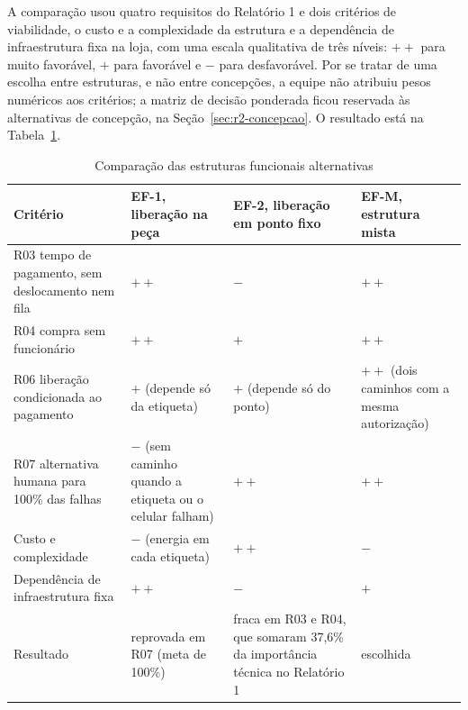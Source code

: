 A comparação usou quatro requisitos do Relatório 1 e dois critérios de viabilidade, o custo e a complexidade da estrutura e a dependência de infraestrutura fixa na loja, com uma escala qualitativa de três níveis: $++$ para muito favorável, $+$ para favorável e $-$ para desfavorável. Por se tratar de uma escolha entre estruturas, e não entre concepções, a equipe não atribuiu pesos numéricos aos critérios; a matriz de decisão ponderada ficou reservada às alternativas de concepção, na Seção~\ref{sec:r2-concepcao}. O resultado está na Tabela~\ref{tab:r2-estruturas}.

\begin{table}[htbp]
    \centering
    \caption{Comparação das estruturas funcionais alternativas}
    \label{tab:r2-estruturas}
    \footnotesize
    \renewcommand{\arraystretch}{1.25}
    \begin{tabularx}{\textwidth}{@{}
        >{\RaggedRight\arraybackslash}p{3.8cm}
        >{\RaggedRight\arraybackslash}X
        >{\RaggedRight\arraybackslash}X
        >{\RaggedRight\arraybackslash}X@{}}
        \toprule
        \textbf{Critério} & \textbf{EF-1, liberação na peça} & \textbf{EF-2, liberação em ponto fixo} & \cellcolor{r2laranjaclaro}\textbf{EF-M, estrutura mista} \\
        \midrule
        R03 tempo de pagamento, sem deslocamento nem fila & $++$ & $-$ & \cellcolor{r2laranjaclaro}$++$ \\
        R04 compra sem funcionário & $++$ & $+$ & \cellcolor{r2laranjaclaro}$++$ \\
        R06 liberação condicionada ao pagamento & $+$ (depende só da etiqueta) & $+$ (depende só do ponto) & \cellcolor{r2laranjaclaro}$++$ (dois caminhos com a mesma autorização) \\
        R07 alternativa humana para 100\% das falhas & $-$ (sem caminho quando a etiqueta ou o celular falham) & $++$ & \cellcolor{r2laranjaclaro}$++$ \\
        Custo e complexidade & $-$ (energia em cada etiqueta) & $++$ & \cellcolor{r2laranjaclaro}$-$ \\
        Dependência de infraestrutura fixa & $++$ & $-$ & \cellcolor{r2laranjaclaro}$+$ \\
        \midrule
        Resultado & reprovada em R07 (meta de 100\%) & fraca em R03 e R04, que somaram 37,6\% da importância técnica no Relatório 1 & \cellcolor{r2laranjaclaro}escolhida \\
        \bottomrule
    \end{tabularx}
\end{table}

